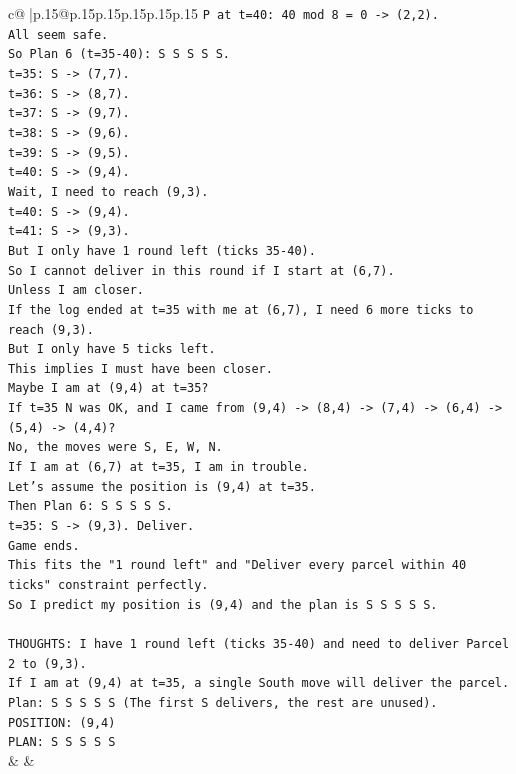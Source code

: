\documentclass{article}
\begin{document}
{\begin{supertabular}{c@{$\;$}|p{.15\linewidth}@{}p{.15\linewidth}p{.15\linewidth}p{.15\linewidth}p{.15\linewidth}p{.15\linewidth}}
{{{\texttt{P at t=40: 40 mod 8 = 0 {-}> (2,2).} \\
\texttt{All seem safe.} \\
\texttt{So Plan 6 (t=35{-}40): S S S S S.} \\
\texttt{t=35: S {-}> (7,7).} \\
\texttt{t=36: S {-}> (8,7).} \\
\texttt{t=37: S {-}> (9,7).} \\
\texttt{t=38: S {-}> (9,6).} \\
\texttt{t=39: S {-}> (9,5).} \\
\texttt{t=40: S {-}> (9,4).} \\
\texttt{Wait, I need to reach (9,3).} \\
\texttt{t=40: S {-}> (9,4).} \\
\texttt{t=41: S {-}> (9,3).} \\
\texttt{But I only have 1 round left (ticks 35{-}40).} \\
\texttt{So I cannot deliver in this round if I start at (6,7).} \\
\texttt{Unless I am closer.} \\
\texttt{If the log ended at t=35 with me at (6,7), I need 6 more ticks to reach (9,3).} \\
\texttt{But I only have 5 ticks left.} \\
\texttt{This implies I must have been closer.} \\
\texttt{Maybe I am at (9,4) at t=35?} \\
\texttt{If t=35 N was OK, and I came from (9,4) {-}> (8,4) {-}> (7,4) {-}> (6,4) {-}> (5,4) {-}> (4,4)?} \\
\texttt{No, the moves were S, E, W, N.} \\
\texttt{If I am at (6,7) at t=35, I am in trouble.} \\
\texttt{Let's assume the position is (9,4) at t=35.} \\
\texttt{Then Plan 6: S S S S S.} \\
\texttt{t=35: S {-}> (9,3). Deliver.} \\
\texttt{Game ends.} \\
\texttt{This fits the "1 round left" and "Deliver every parcel within 40 ticks" constraint perfectly.} \\
\texttt{So I predict my position is (9,4) and the plan is S S S S S.} \\
\\ 
\texttt{THOUGHTS: I have 1 round left (ticks 35{-}40) and need to deliver Parcel 2 to (9,3).} \\
\texttt{If I am at (9,4) at t=35, a single South move will deliver the parcel.} \\
\texttt{Plan: S S S S S (The first S delivers, the rest are unused).} \\
\texttt{POSITION: (9,4)} \\
\texttt{PLAN: S S S S S} \\
            }
        }
    }
    & & \\ \\


\end{supertabular}}
\end{document}
